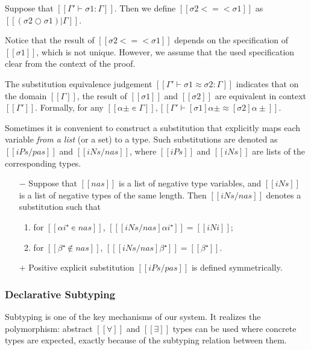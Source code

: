\begin{definition}
  Suppose that $[[Γ' ⊢ σ1 : Γ]]$.
  Then we define $[[σ2 <=< σ1]]$ as $[[(σ2 ○ σ1)|Γ]]$.
\end{definition}
Notice that the result of $[[σ2 <=< σ1]]$ depends on the 
specification of $[[σ1]]$, which is not unique. 
However, we assume that the used specification clear from the 
context of the proof. 

\begin{definition}
  The substitution equivalence judgement $[[Γ' ⊢ σ1 ≈ σ2 : Γ]]$ 
  indicates that on the domain $[[Γ]]$, 
  the result of $[[σ1]]$ and $[[σ2]]$ are equivalent in context $[[Γ']]$.
  Formally, for any $[[α± ∊ Γ]], [[ Γ' ⊢ [σ1]α± ≈ [σ2]α± ]]$.
\end{definition}

Sometimes it is convenient to construct a substitution 
that explicitly maps each variable \emph{from a list} 
(or a set) to a type.
Such substitutions are denoted as $[[iPs / pas]]$
and $[[iNs / nas]]$, where $[[iPs]]$ and $[[iNs]]$ are lists of 
the corresponding types.
\begin{definition}
  \hfill
  \begin{itemize}
    \item [$-$]
      Suppose that $[[nas]]$ is a list of negative type variables,
      and $[[iNs]]$ is a list of negative types of the same length.
      Then $[[iNs / nas]]$ denotes a substitution such that 
      \begin{enumerate}
        \item for $[[αi⁺ ∊ {nas}]]$, $[[ [iNs / nas] αi⁺]] = [[iNi]]$;
        \item for $[[β⁺ ∉ {nas}]]$, $[[ [iNs / nas] β⁺]] = [[β⁺]]$.
      \end{enumerate}
    \item [$+$]
      Positive explicit substitution $[[iPs / pas]]$
      is defined symmetrically.
  \end{itemize}
\end{definition}

\subsubsection{Declarative Subtyping}
Subtyping is one of the key mechanisms of our system. 
It realizes the polymorphism: abstract $[[∀]]$ and 
$[[∃]]$ types can be used where concrete types are expected,
exactly because of the subtyping relation between them.

